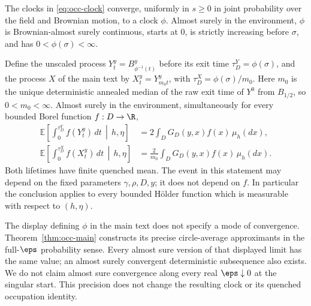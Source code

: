 \begin{theorem}\label{thm:occ-main}
The clocks in \eqref{eq:occ-clock} converge, uniformly in $s\geq0$ in joint
probability over the field and Brownian motion, to a clock $\phi$.
Almost surely in the environment, $\phi$ is Brownian-almost surely
continuous, starts at $0$, is strictly increasing before $\sigma$,
and has $0<\phi(\sigma)<\infty$.

Define the unscaled process $Y_t^y=B^y_{\phi^{-1}(t)}$ before its exit
time $\tau_D^Y=\phi(\sigma)$, and the process $X$ of the main text by
$X_t^y=Y^y_{m_0t}$, with $\tau_D^X=\phi(\sigma)/m_0$.
Here $m_0$ is the unique deterministic annealed median of the raw exit time
of $Y^0$ from $B_{1/2}$, so $0<m_0<\infty$.
Almost surely in the environment, simultaneously for every bounded
Borel function $f:D\to\R$,
\begin{align}
 \mathbb{E}\left[\int_0^{\tau_D^Y}f(Y_t^y)\,dt\,\middle|\,h,\eta\right]
   &=2\int_DG_D(y,x)f(x)\,\mu_h(dx), \label{eq:occ-raw}\\
 \mathbb{E}\left[\int_0^{\tau_D^X}f(X_t^y)\,dt\,\middle|\,h,\eta\right]
   &=\frac2{m_0}\int_DG_D(y,x)f(x)\,\mu_h(dx).
       \label{eq:occ-scaled}
\end{align}
Both lifetimes have finite quenched mean. The event in this statement
may depend on the fixed parameters $\gamma,\rho,D,y$; it does not
depend on $f$. In particular the conclusion applies to every bounded
H\"older function which is measurable with respect to $(h,\eta)$.
\end{theorem}

\begin{remark}\label{rem:occ-mode}
The display defining $\phi$ in the main text does not specify a mode of
convergence. Theorem~\ref{thm:occ-main} constructs its precise
circle-average approximants in the full-$\eps$ probability sense.
Every almost sure version of that displayed limit has the same value;
an almost surely convergent deterministic subsequence also exists.
We do not claim almost sure convergence along every real
$\eps\downarrow0$ at the singular start. This precision does not change
the resulting clock or its quenched occupation identity.
\end{remark}

